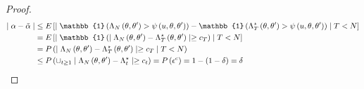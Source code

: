 \documentclass{article}
\theoremstyle{definition}
\begin{document}
\begin{proof}
\begin{equation*}
\begin{split}
\mid \alpha - \Tilde{\alpha}\mid &\leq
     E\left[\mid\mathbb{1}\left(\Lambda_N\left(\theta, \theta'\right)> \psi\left(u, \theta, \theta'\right)\right) -\mathbb{1}\left( \Lambda_T^{\star}\left(\theta, \theta'\right)>\psi\left(u, \theta, \theta'\right)\right)\mid T<N \right] \\ &= E\left[\mid \mathbb{1}\left(\mid \Lambda_N\left(\theta, \theta'\right) - \Lambda_T^{\star}\left(\theta, \theta'\right)\mid \geq c_T\right)\mid T<N\right]\\ &= P\left(\mid\Lambda_N\left(\theta, \theta'\right) - \Lambda_T^{\star}\left(\theta, \theta'\right)\mid \geq c_T \mid T < N \right) \\
     & \leq P\left(\cup_{t \geq 1} \mid \Lambda_N\left(\theta, \theta'\right) - \Lambda_t^{\star}\mid \geq c_t \right) = P\left(\epsilon^c\right) = 1 - \left( 1 - \delta\right) = \delta 
\end{split}
\end{equation*}
\end{proof}
\end{document}
